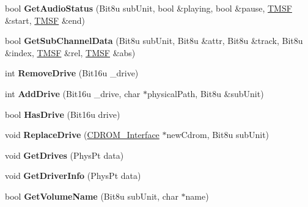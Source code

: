\begin{DoxyCompactItemize}
\item 
\hypertarget{classCMscdex_a6d7888d1040575a0a0a42050349474fe}{bool {\bfseries Get\-Audio\-Status} (Bit8u sub\-Unit, bool \&playing, bool \&pause, \hyperlink{structSMSF}{T\-M\-S\-F} \&start, \hyperlink{structSMSF}{T\-M\-S\-F} \&end)}\label{classCMscdex_a6d7888d1040575a0a0a42050349474fe}

\item 
\hypertarget{classCMscdex_acc843b37e0b19afd37b166f765f7da44}{bool {\bfseries Get\-Sub\-Channel\-Data} (Bit8u sub\-Unit, Bit8u \&attr, Bit8u \&track, Bit8u \&index, \hyperlink{structSMSF}{T\-M\-S\-F} \&rel, \hyperlink{structSMSF}{T\-M\-S\-F} \&abs)}\label{classCMscdex_acc843b37e0b19afd37b166f765f7da44}

\item 
\hypertarget{classCMscdex_ac4ec6dc6be27ecfb68a5e1260dd9887b}{int {\bfseries Remove\-Drive} (Bit16u \-\_\-drive)}\label{classCMscdex_ac4ec6dc6be27ecfb68a5e1260dd9887b}

\item 
\hypertarget{classCMscdex_a7b9b06adbd55c99acd20a49d6ea67941}{int {\bfseries Add\-Drive} (Bit16u \-\_\-drive, char $\ast$physical\-Path, Bit8u \&sub\-Unit)}\label{classCMscdex_a7b9b06adbd55c99acd20a49d6ea67941}

\item 
\hypertarget{classCMscdex_af0edfe20ac94f225b50f78ce6b3ba7ac}{bool {\bfseries Has\-Drive} (Bit16u drive)}\label{classCMscdex_af0edfe20ac94f225b50f78ce6b3ba7ac}

\item 
\hypertarget{classCMscdex_af8e409575d47ef937b29cb448f4488d7}{void {\bfseries Replace\-Drive} (\hyperlink{classCDROM__Interface}{C\-D\-R\-O\-M\-\_\-\-Interface} $\ast$new\-Cdrom, Bit8u sub\-Unit)}\label{classCMscdex_af8e409575d47ef937b29cb448f4488d7}

\item 
\hypertarget{classCMscdex_af22f4c89b95a722c9b0f767724ce06dd}{void {\bfseries Get\-Drives} (Phys\-Pt data)}\label{classCMscdex_af22f4c89b95a722c9b0f767724ce06dd}

\item 
\hypertarget{classCMscdex_a330841e5a31e66bc7776306caedb6819}{void {\bfseries Get\-Driver\-Info} (Phys\-Pt data)}\label{classCMscdex_a330841e5a31e66bc7776306caedb6819}

\item 
\hypertarget{classCMscdex_a4ba6a6531f3ad487dd832d49c2de5f92}{bool {\bfseries Get\-Volume\-Name} (Bit8u sub\-Unit, char $\ast$name)}\label{classCMscdex_a4ba6a6531f3ad487dd832d49c2de5f92}


\end{DoxyCompactItemize}
